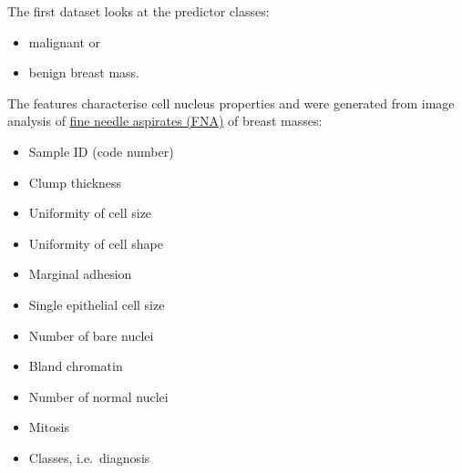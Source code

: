 \documentclass[]{article}
\newenvironment{Shaded}{\begin{snugshade}}{\end{snugshade}}
\newcommand{\KeywordTok}[1]{\textcolor[rgb]{0.13,0.29,0.53}{\textbf{{#1}}}}
\newcommand{\DataTypeTok}[1]{\textcolor[rgb]{0.13,0.29,0.53}{{#1}}}
\newcommand{\StringTok}[1]{\textcolor[rgb]{0.31,0.60,0.02}{{#1}}}
\newcommand{\OtherTok}[1]{\textcolor[rgb]{0.56,0.35,0.01}{{#1}}}
\newcommand{\NormalTok}[1]{{#1}}
\providecommand{\tightlist}{%
  \setlength{\itemsep}{0pt}\setlength{\parskip}{0pt}}
\begin{document}
The first dataset looks at the predictor classes:

\begin{itemize}
\tightlist
\item
  malignant or
\item
  benign breast mass.
\end{itemize}

The features characterise cell nucleus properties and were generated
from image analysis of
\href{https://en.wikipedia.org/wiki/Fine-needle_aspiration}{fine needle
aspirates (FNA)} of breast masses:

\begin{itemize}
\tightlist
\item
  Sample ID (code number)
\item
  Clump thickness
\item
  Uniformity of cell size
\item
  Uniformity of cell shape
\item
  Marginal adhesion
\item
  Single epithelial cell size
\item
  Number of bare nuclei
\item
  Bland chromatin
\item
  Number of normal nuclei
\item
  Mitosis
\item
  Classes, i.e.~diagnosis
\end{itemize}

\begin{Shaded}
\end{Shaded}
\end{document}
